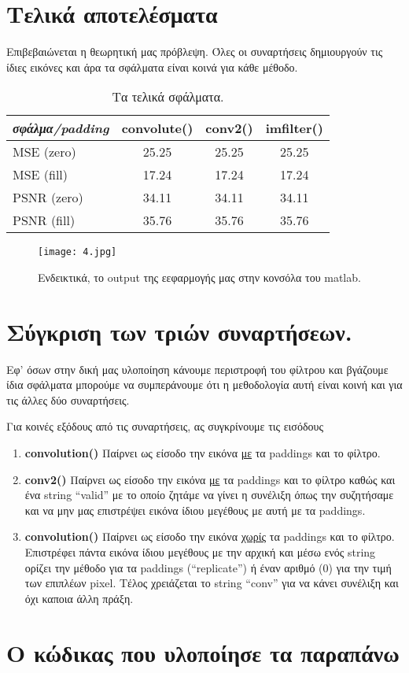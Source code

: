 \documentclass[11pt]{scrartcl} %
\begin{document}
\clearpage
\newpage

\section{Τελικά αποτελέσματα}

Επιβεβαιώνεται η θεωρητική μας πρόβλεψη. Όλες οι συναρτήσεις δημιουργούν τις ίδιες εικόνες και άρα
τα σφάλματα είναι κοινά για κάθε μέθοδο.
\begin{table}[h] %
	\centering %
	\begin{tabular}{l c c c}
		\toprule
		\textit{σφάλμα/padding} & \textbf{convolute()} & \textbf{conv2()} & \textbf{imfilter()} \\
		\midrule
		\midrule
		MSE (zero) & 25.25 & 25.25 & 25.25 \\
		MSE (fill) & 17.24 & 17.24 & 17.24 \\
		\midrule
		PSNR (zero) & 34.11 & 34.11 & 34.11 \\
		PSNR (fill) & 35.76 & 35.76 & 35.76 \\
		\bottomrule
	\end{tabular}
	\caption{Τα τελικά σφάλματα.}
\end{table}

\begin{figure}[h] %
	\centering
	\texttt{[image: 4.jpg]} %
	\caption{Ενδεικτικά, το output της εεφαρμογής μας στην κονσόλα του matlab.}
\end{figure}


\section{Σύγκριση των τριών συναρτήσεων.}

Εφ' όσων στην δική μας υλοποίηση κάνουμε περιστροφή του φίλτρου και βγάζουμε ίδια σφάλματα μπορούμε
να συμπεράνουμε ότι η μεθοδολογία αυτή είναι κοινή και για τις άλλες δύο συναρτήσεις.


Για κοινές εξόδους από τις συναρτήσεις, ας συγκρίνουμε τις εισόδους
\begin{enumerate}
  \item \textbf{convolution()} Παίρνει ως είσοδο την εικόνα \underline{με} τα paddings και το φίλτρο.
  \item \textbf{conv2()} Παίρνει ως είσοδο την εικόνα \underline{με} τα paddings και το φίλτρο καθώς
  και ένα string ``valid'' με το οποίο ζητάμε να γίνει η συνέλιξη όπως την συζητήσαμε και να μην μας
  επιστρέψει εικόνα ίδιου μεγέθους με αυτή με τα paddings.
  \item \textbf{convolution()} Παίρνει ως είσοδο την εικόνα \underline{χωρίς} τα paddings και το φίλτρο.
  Επιστρέφει πάντα εικόνα ίδιου μεγέθους με την αρχική και μέσω ενός string ορίζει την μέθοδο για τα
  paddings (``replicate'') ή έναν αριθμό (0) για την τιμή των επιπλέων pixel. Τέλος χρειάζεται το string
  ``conv'' για να κάνει συνέλιξη και όχι καποια άλλη πράξη.
\end{enumerate}

\section{Ο κώδικας που υλοποίησε τα παραπάνω}

\end{document}
